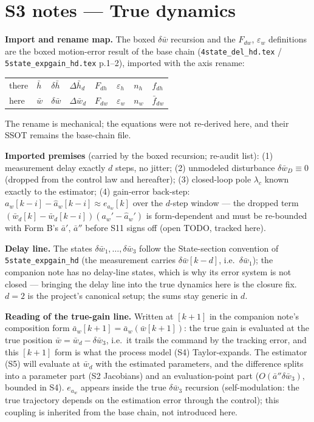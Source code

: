 \documentclass[11pt,a4paper,fontset=none]{ctexart}
\begin{document}
\section*{S3 notes --- True dynamics}

\textbf{Import and rename map.}  The boxed $\delta\bar{w}$ recursion and the
$F_{dw}$, $\varepsilon_w$ definitions are the boxed motion-error result of
the base chain (\texttt{4state\_del\_hd.tex} /
\texttt{5state\_expgain\_hd.tex} p.1--2), imported with the axis rename:
\begin{center}
\begin{tabular}{llllllll}
\toprule
there & $\bar{h}$ & $\delta\bar{h}$ & $\Delta\bar{h}_d$ & $F_{dh}$ &
  $\varepsilon_h$ & $n_h$ & $f_{dh}$ \\
here  & $\bar{w}$ & $\delta\bar{w}$ & $\Delta\bar{w}_d$ & $F_{dw}$ &
  $\varepsilon_w$ & $n_w$ & $\bar{f}_{dw}$ \\
\bottomrule
\end{tabular}
\end{center}
The rename is mechanical; the equations were not re-derived here, and their
SSOT remains the base-chain file.

\textbf{Imported premises} (carried by the boxed recursion; re-audit list):
(1) measurement delay exactly $d$ steps, no jitter;
(2) unmodeled disturbance $\delta\bar{w}_D \equiv 0$ (dropped from the
control law and hereafter);
(3) closed-loop pole $\lambda_c$ known exactly to the estimator;
(4) gain-error back-step: $a_w[k-i]-\hat{a}_w[k-i] \approx e_{a_w}[k]$ over
the $d$-step window --- the dropped term
$(\bar{w}_d[k]-\bar{w}_d[k-i])(a_w'-\hat{a}_w')$ is form-dependent and must
be re-bounded with Form B's $\bar{a}'$, $\bar{a}''$ before S11 signs off
(open TODO, tracked here).

\textbf{Delay line.}  The states $\delta\bar{w}_1,\dots,\delta\bar{w}_3$
follow the State-section convention of \texttt{5state\_expgain\_hd} (the
measurement carries $\delta\bar{w}[k-d]$, i.e.\ $\delta\bar{w}_1$); the
companion note has no delay-line states, which is why its error system is
not closed --- bringing the delay line into the true dynamics here is the
closure fix.  $d=2$ is the project's canonical setup; the sums stay generic
in $d$.

\textbf{Reading of the true-gain line.}  Written at $[k{+}1]$ in the
companion note's composition form
$\bar{a}_w[k+1] = \bar{a}_w(\bar{w}[k+1])$: the true gain is evaluated at
the true position $\bar{w} = \bar{w}_d-\delta\bar{w}_3$, i.e.\ it trails the
command by the tracking error, and this $[k{+}1]$ form is what the process
model (S4) Taylor-expands.  The estimator (S5) will evaluate at $\bar{w}_d$
with the estimated parameters, and the difference splits into a parameter
part (S2 Jacobians) and an evaluation-point part
($O(\bar{a}''\delta\bar{w}_3)$, bounded in S4).  $e_{a_w}$ appears inside
the true $\delta\bar{w}_3$ recursion (self-modulation: the true trajectory
depends on the estimation error through the control); this coupling is
inherited from the base chain, not introduced here.
\end{document}
